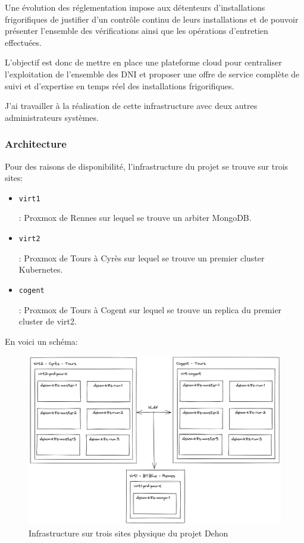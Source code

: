 \documentclass[12pt]{article}
\begin{document}
Une évolution des réglementation impose aux détenteurs d'installations frigorifiques de justifier d'un contrôle continu de leurs installations et de pouvoir présenter l'ensemble des vérifications ainsi que les opérations d'entretien effectuées.

L'objectif est donc de mettre en place une plateforme cloud pour centraliser l'exploitation de l'ensemble des DNI et proposer une offre de service complète de suivi et d'expertise en temps réel des installations frigorifiques.

J'ai travailler à la réalisation de cette infrastructure avec deux autres administrateurs systèmes.

\subsubsection{Architecture}
Pour des raisons de disponibilité, l'infrastructure du projet se trouve sur trois sites:
\begin{itemize}
    \item \begin{code}\texttt{virt1}\end{code}: \gls{Proxmox} de Rennes sur lequel se trouve un arbiter MongoDB. 
    \item \begin{code}\texttt{virt2}\end{code}: \gls{Proxmox} de Tours à Cyrès sur lequel se trouve un premier \gls{cluster} \gls{Kubernetes}.
    \item \begin{code}\texttt{cogent}\end{code}: \gls{Proxmox} de Tours à Cogent sur lequel se trouve un replica du premier \gls{cluster} de virt2.
\end{itemize}

\newpage
En voici un schéma:
\begin{figure}[!ht]
    \centering
        \includegraphics[width=\textwidth]{src/Dehon1.png}
    \caption{Infrastructure sur trois sites physique du projet Dehon}
    \label{fig:dehon1}
\end{figure}
\end{document}
